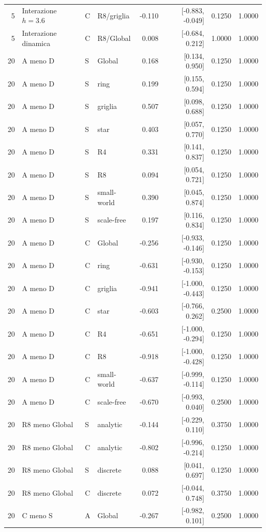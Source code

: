 \begin{longtable}{@{}rlllrrrr@{}}
5 & Interazione $h=3.6$ & C & R8/griglia & -0.110 & [-0.883, -0.049] & 0.1250 & 1.0000\\
5 & Interazione dinamica & C & R8/Global & 0.008 & [-0.684, 0.212] & 1.0000 & 1.0000\\
20 & A meno D & S & Global & 0.168 & [0.134, 0.950] & 0.1250 & 1.0000\\
20 & A meno D & S & ring & 0.199 & [0.155, 0.594] & 0.1250 & 1.0000\\
20 & A meno D & S & griglia & 0.507 & [0.098, 0.688] & 0.1250 & 1.0000\\
20 & A meno D & S & star & 0.403 & [0.057, 0.770] & 0.1250 & 1.0000\\
20 & A meno D & S & R4 & 0.331 & [0.141, 0.837] & 0.1250 & 1.0000\\
20 & A meno D & S & R8 & 0.094 & [0.054, 0.721] & 0.1250 & 1.0000\\
20 & A meno D & S & small-world & 0.390 & [0.045, 0.874] & 0.1250 & 1.0000\\
20 & A meno D & S & scale-free & 0.197 & [0.116, 0.834] & 0.1250 & 1.0000\\
20 & A meno D & C & Global & -0.256 & [-0.933, -0.146] & 0.1250 & 1.0000\\
20 & A meno D & C & ring & -0.631 & [-0.930, -0.153] & 0.1250 & 1.0000\\
20 & A meno D & C & griglia & -0.941 & [-1.000, -0.443] & 0.1250 & 1.0000\\
20 & A meno D & C & star & -0.603 & [-0.766, 0.262] & 0.2500 & 1.0000\\
20 & A meno D & C & R4 & -0.651 & [-1.000, -0.294] & 0.1250 & 1.0000\\
20 & A meno D & C & R8 & -0.918 & [-1.000, -0.428] & 0.1250 & 1.0000\\
20 & A meno D & C & small-world & -0.637 & [-0.999, -0.114] & 0.1250 & 1.0000\\
20 & A meno D & C & scale-free & -0.670 & [-0.993, 0.040] & 0.2500 & 1.0000\\
20 & R8 meno Global & S & analytic & -0.144 & [-0.229, 0.110] & 0.3750 & 1.0000\\
20 & R8 meno Global & C & analytic & -0.802 & [-0.996, -0.214] & 0.1250 & 1.0000\\
20 & R8 meno Global & S & discrete & 0.088 & [0.041, 0.697] & 0.1250 & 1.0000\\
20 & R8 meno Global & C & discrete & 0.072 & [-0.044, 0.748] & 0.3750 & 1.0000\\
20 & C meno S & A & Global & -0.267 & [-0.982, 0.101] & 0.2500 & 1.0000\\

\end{longtable}

